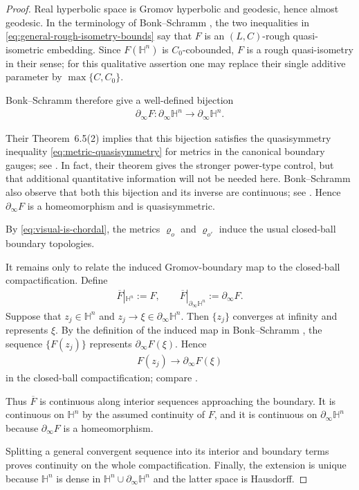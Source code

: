 \documentclass[11pt]{amsart}
\theoremstyle{plain}
\theoremstyle{plain}
\theoremstyle{plain}
\newcommand{\Hn}{\mathbb H^n}
\newcommand{\bdry}{\partial_\infty}
\numberwithin{equation}{section}
\begin{document}
\begin{proof}
Real hyperbolic space is Gromov hyperbolic and geodesic, hence almost
geodesic.  In the terminology of Bonk--Schramm \cite{BonkSchramm}, the two inequalities in
\eqref{eq:general-rough-isometry-bounds} say that \(F\) is an
\((L,C)\)-rough quasi-isometric embedding.  Since \(F(\Hn)\) is
\(C_0\)-cobounded, \(F\) is a rough quasi-isometry in their sense; for
this qualitative assertion one may replace their single additive
parameter by \(\max\{C,C_0\}\).

Bonk--Schramm
\cite[Proposition~6.3\textup{(1)}, \textup{(2)}, and \textup{(4)}]{BonkSchramm}
therefore give a well-defined bijection
\begin{align}
\bdry F:\bdry\Hn\longrightarrow\bdry\Hn.
\nonumber
\end{align}


Their Theorem~6.5\textup{(2)} implies that this bijection satisfies the
quasisymmetry inequality \eqref{eq:metric-quasisymmetry} for metrics in the
canonical boundary gauges;
see \cite[pp.~283--284]{BonkSchramm}.  In fact, their theorem gives the
stronger power-type control, but that additional quantitative information
will not be needed here.  Bonk--Schramm also observe that both this bijection and its inverse are continuous; see
\cite[p.~281]{BonkSchramm}.  Hence \(\bdry F\) is a homeomorphism and is
quasisymmetric.

By \eqref{eq:visual-is-chordal}, the metrics \(\varrho_o\) and
\(\varrho_{o'}\) induce the usual closed-ball boundary topologies.

It remains only to relate the induced Gromov-boundary map to the
closed-ball compactification.  Define
\begin{align}
\overline F|_{\Hn}:=F,
\qquad
\overline F|_{\bdry\Hn}:=\bdry F.
\nonumber
\end{align}
Suppose that \(z_j\in\Hn\) and \(z_j\to\xi\in\bdry\Hn\).  Then
\(\{z_j\}\) converges at infinity and represents \(\xi\).  By the
definition of the induced map in Bonk--Schramm
\cite[Proposition~6.3\textup{(2)}, pp.~282--283]{BonkSchramm},
the sequence \(\{F(z_j)\}\) represents \(\bdry F(\xi)\).  Hence
\begin{align}
F(z_j)\longrightarrow\bdry F(\xi)
\nonumber
\end{align}
in the closed-ball compactification; compare
.

Thus \(\overline F\) is continuous along interior sequences approaching
the boundary.  It is continuous on \(\Hn\) by the assumed continuity of
\(F\), and it is continuous on \(\bdry\Hn\) because \(\bdry F\) is a
homeomorphism.  

Splitting a general convergent sequence into its interior
and boundary terms proves continuity on the whole compactification.
Finally, the extension is unique because \(\Hn\) is dense in
\(\Hn\cup\bdry\Hn\) and the latter space is Hausdorff.
\end{proof}
\end{document}
